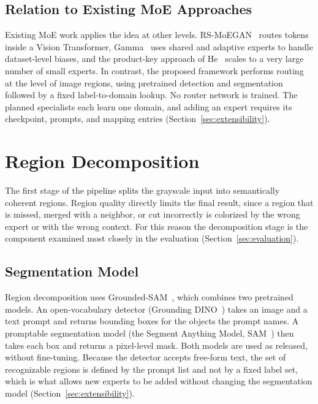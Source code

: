 \documentclass{FastFyp}
\begin{document}
\subsection{Relation to Existing MoE Approaches}

Existing MoE work applies the idea at other levels. RS-MoEGAN~\cite{ref16} routes tokens inside a Vision Transformer, Gamma~\cite{ref15} uses shared and adaptive experts to handle dataset-level biases, and the product-key approach of He~\cite{ref14} scales to a very large number of small experts. In contrast, the proposed framework performs routing at the level of image regions, using pretrained detection and segmentation followed by a fixed label-to-domain lookup. No router network is trained. The planned specialists each learn one domain, and adding an expert requires its checkpoint, prompts, and mapping entries (Section~\ref{sec:extensibility}).

\section{Region Decomposition}
\label{sec:decomposition}

The first stage of the pipeline splits the grayscale input into semantically coherent regions. Region quality directly limits the final result, since a region that is missed, merged with a neighbor, or cut incorrectly is colorized by the wrong expert or with the wrong context. For this reason the decomposition stage is the component examined most closely in the evaluation (Section~\ref{sec:evaluation}).

\subsection{Segmentation Model}

Region decomposition uses Grounded-SAM~\cite{ref17}, which combines two pretrained models. An open-vocabulary detector (Grounding DINO~\cite{liu2024groundingdino}) takes an image and a text prompt and returns bounding boxes for the objects the prompt names. A promptable segmentation model (the Segment Anything Model, SAM~\cite{kirillov2023sam}) then takes each box and returns a pixel-level mask. Both models are used as released, without fine-tuning. Because the detector accepts free-form text, the set of recognizable regions is defined by the prompt list and not by a fixed label set, which is what allows new experts to be added without changing the segmentation model (Section~\ref{sec:extensibility}).
\end{document}
